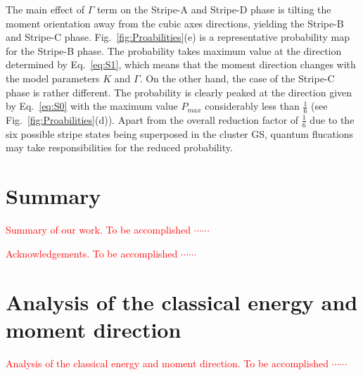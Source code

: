\documentclass[aps,prb,reprint,amsfonts,amsmath,amssymb,showpacs,groupedaddress,superscriptaddress]{revtex4-1}
\begin{document}
The main effect of $\Gamma$ term on the Stripe-A and Stripe-D phase is tilting the moment orientation away from the cubic axes directions, yielding the Stripe-B and Stripe-C phase. Fig.~\ref{fig:Proabilities}(e) is a representative probability map for the Stripe-B phase. The probability takes maximum value at the direction determined by Eq.~\eqref{eq:S1}, which means that the moment direction changes with the model parameters $K$ and $\Gamma$. On the other hand, the case of the Stripe-C phase is rather different. The probability is clearly peaked at the direction given by Eq.~\eqref{eq:S0} with the maximum value $P_{max}$ considerably less than $\frac{1}{6}$ (see Fig.~\ref{fig:Proabilities}(d)). Apart from the overall reduction factor of $\frac{1}{6}$ due to the six possible stripe states being superposed in the cluster GS, quantum flucations may take responsibilities for the reduced probability.

\section{\label{sec:SectionVI}Summary}
\textcolor{red}{Summary of our work. To be accomplished $\cdots \cdots$}

\begin{acknowledgments}
    \textcolor{red}{Acknowledgements.  To be accomplished $\cdots \cdots$}
\end{acknowledgments}


\appendix

\section{Analysis of the classical energy and moment direction}
\textcolor{red}{Analysis of the classical energy and moment direction. To be accomplished $\cdots \cdots$}

\newpage


\end{document}
